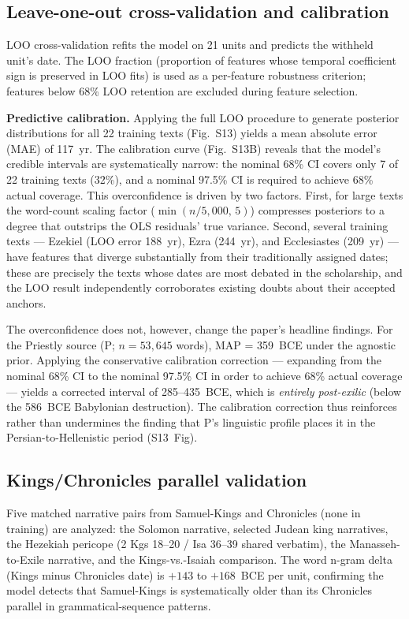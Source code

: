 \documentclass[10pt,letterpaper]{article}
\begin{document}
\subsection*{Leave-one-out cross-validation and calibration}

LOO cross-validation refits the model on 21 units and predicts the
withheld unit's date.  The LOO fraction (proportion of features whose
temporal coefficient sign is preserved in LOO fits) is used as a
per-feature robustness criterion; features below 68\% LOO retention
are excluded during feature selection.

\textbf{Predictive calibration.}
Applying the full LOO procedure to generate posterior distributions for
all 22 training texts (Fig.~S13) yields a mean absolute error (MAE) of
117~yr.  The calibration curve (Fig.~S13B) reveals that the model's
credible intervals are systematically narrow: the nominal 68\% CI covers
only 7 of 22 training texts (32\%), and a nominal 97.5\% CI is required
to achieve 68\% actual coverage.  This overconfidence is driven by two
factors.  First, for large texts the word-count scaling factor
($\min(n/5{,}000,\,5)$) compresses posteriors to a degree that outstrips
the OLS residuals' true variance.  Second, several training texts ---
Ezekiel (LOO error 188~yr), Ezra (244~yr), and Ecclesiastes (209~yr)
--- have features that diverge substantially from their traditionally
assigned dates; these are precisely the texts whose dates are most
debated in the scholarship, and the LOO result independently
corroborates existing doubts about their accepted anchors.

The overconfidence does not, however, change the paper's headline
findings.  For the Priestly source (P; $n=53{,}645$ words), MAP
= 359~BCE under the agnostic prior.  Applying the conservative
calibration correction --- expanding from the nominal 68\% CI to the
nominal 97.5\% CI in order to achieve 68\% actual coverage ---
yields a corrected interval of 285--435~BCE, which is \emph{entirely
post-exilic} (below the 586~BCE Babylonian destruction).  The
calibration correction thus reinforces rather than undermines the
finding that P's linguistic profile places it in the Persian-to-Hellenistic
period (S13~Fig).

\subsection*{Kings/Chronicles parallel validation}

Five matched narrative pairs from Samuel-Kings and Chronicles (none
in training) are analyzed: the Solomon narrative, selected Judean king
narratives, the Hezekiah pericope (2 Kgs 18--20 / Isa 36--39 shared
verbatim), the Manasseh-to-Exile narrative, and the Kings-vs.-Isaiah
comparison.  The word n-gram delta (Kings minus Chronicles date) is
$+143$ to $+168$~BCE per unit, confirming the model detects that
Samuel-Kings is systematically older than its Chronicles parallel in
grammatical-sequence patterns.
\end{document}
